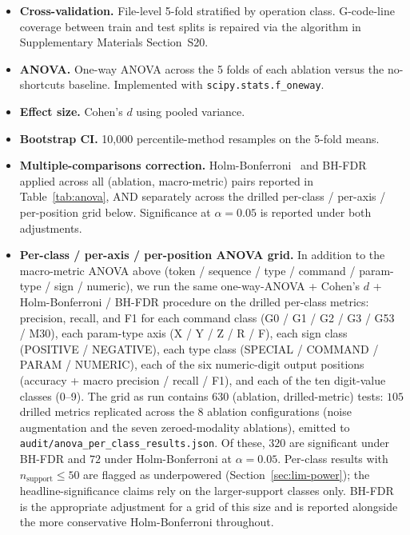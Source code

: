 \begin{itemize}
\item \textbf{Cross-validation.} File-level 5-fold stratified by operation
class. G-code-line coverage between train and test splits is repaired via
the algorithm in Supplementary Materials Section~S20.
\item \textbf{ANOVA.} One-way ANOVA across the 5 folds of each ablation
versus the no-shortcuts baseline. Implemented with
\texttt{scipy.stats.f\_oneway}.
\item \textbf{Effect size.} Cohen's $d$ using pooled variance.
\item \textbf{Bootstrap CI.} 10{,}000 percentile-method resamples on the
5-fold means.
\item \textbf{Multiple-comparisons correction.} Holm-Bonferroni~\cite{holm1979simple} and BH-FDR~\cite{benjamini1995controlling}
applied across all (ablation, macro-metric) pairs reported in
Table~\ref{tab:anova}, AND separately across the drilled per-class /
per-axis / per-position grid below. Significance at $\alpha=0.05$ is
reported under both adjustments.

\item \textbf{Per-class / per-axis / per-position ANOVA grid.} In
addition to the macro-metric ANOVA above (token / sequence / type /
command / param-type / sign / numeric), we run the same one-way-ANOVA +
Cohen's $d$ + Holm-Bonferroni / BH-FDR procedure on the drilled
per-class metrics: precision, recall, and F1 for each command class
(G0 / G1 / G2 / G3 / G53 / M30), each param-type axis (X / Y / Z / R /
F), each sign class (POSITIVE / NEGATIVE), each type class (SPECIAL /
COMMAND / PARAM / NUMERIC), each of the six numeric-digit output
positions (accuracy + macro precision / recall / F1), and each of the
ten digit-value classes (0--9). The grid as run contains $630$
(ablation, drilled-metric) tests: $105$ drilled metrics replicated
across the $8$ ablation configurations (noise augmentation and the
seven zeroed-modality ablations), emitted to
\texttt{audit/\allowbreak anova\_per\_class\_results.json}. Of these, $320$ are
significant under BH-FDR and $72$ under Holm-Bonferroni at
$\alpha=0.05$. Per-class results with $n_{\text{support}} \le 50$ are
flagged as underpowered (Section~\ref{sec:lim-power}); the
headline-significance claims rely on the larger-support classes only.
BH-FDR is the appropriate adjustment for a grid of this size and is
reported alongside the more conservative Holm-Bonferroni throughout.
\end{itemize}

